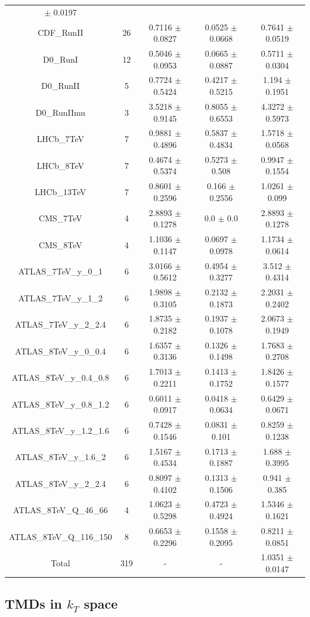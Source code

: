 \documentclass[
]{article}
\begin{document}
\begin{longtable}[]{@{}ccccc@{}}
\(\pm\) 0.0197\tabularnewline
CDF\_RunII & 26 & 0.7116 \(\pm\) 0.0827 & 0.0525 \(\pm\) 0.0668 & 0.7641
\(\pm\) 0.0519\tabularnewline
D0\_RunI & 12 & 0.5046 \(\pm\) 0.0953 & 0.0665 \(\pm\) 0.0887 & 0.5711
\(\pm\) 0.0304\tabularnewline
D0\_RunII & 5 & 0.7724 \(\pm\) 0.5424 & 0.4217 \(\pm\) 0.5215 & 1.194
\(\pm\) 0.1951\tabularnewline
D0\_RunIImu & 3 & 3.5218 \(\pm\) 0.9145 & 0.8055 \(\pm\) 0.6553 & 4.3272
\(\pm\) 0.5973\tabularnewline
LHCb\_7TeV & 7 & 0.9881 \(\pm\) 0.4896 & 0.5837 \(\pm\) 0.4834 & 1.5718
\(\pm\) 0.0568\tabularnewline
LHCb\_8TeV & 7 & 0.4674 \(\pm\) 0.5374 & 0.5273 \(\pm\) 0.508 & 0.9947
\(\pm\) 0.1554\tabularnewline
LHCb\_13TeV & 7 & 0.8601 \(\pm\) 0.2596 & 0.166 \(\pm\) 0.2556 & 1.0261
\(\pm\) 0.099\tabularnewline
CMS\_7TeV & 4 & 2.8893 \(\pm\) 0.1278 & 0.0 \(\pm\) 0.0 & 2.8893 \(\pm\)
0.1278\tabularnewline
CMS\_8TeV & 4 & 1.1036 \(\pm\) 0.1147 & 0.0697 \(\pm\) 0.0978 & 1.1734
\(\pm\) 0.0614\tabularnewline
ATLAS\_7TeV\_y\_0\_1 & 6 & 3.0166 \(\pm\) 0.5612 & 0.4954 \(\pm\) 0.3277
& 3.512 \(\pm\) 0.4314\tabularnewline
ATLAS\_7TeV\_y\_1\_2 & 6 & 1.9898 \(\pm\) 0.3105 & 0.2132 \(\pm\) 0.1873
& 2.2031 \(\pm\) 0.2402\tabularnewline
ATLAS\_7TeV\_y\_2\_2.4 & 6 & 1.8735 \(\pm\) 0.2182 & 0.1937 \(\pm\)
0.1078 & 2.0673 \(\pm\) 0.1949\tabularnewline
ATLAS\_8TeV\_y\_0\_0.4 & 6 & 1.6357 \(\pm\) 0.3136 & 0.1326 \(\pm\)
0.1498 & 1.7683 \(\pm\) 0.2708\tabularnewline
ATLAS\_8TeV\_y\_0.4\_0.8 & 6 & 1.7013 \(\pm\) 0.2211 & 0.1413 \(\pm\)
0.1752 & 1.8426 \(\pm\) 0.1577\tabularnewline
ATLAS\_8TeV\_y\_0.8\_1.2 & 6 & 0.6011 \(\pm\) 0.0917 & 0.0418 \(\pm\)
0.0634 & 0.6429 \(\pm\) 0.0671\tabularnewline
ATLAS\_8TeV\_y\_1.2\_1.6 & 6 & 0.7428 \(\pm\) 0.1546 & 0.0831 \(\pm\)
0.101 & 0.8259 \(\pm\) 0.1238\tabularnewline
ATLAS\_8TeV\_y\_1.6\_2 & 6 & 1.5167 \(\pm\) 0.4534 & 0.1713 \(\pm\)
0.1887 & 1.688 \(\pm\) 0.3995\tabularnewline
ATLAS\_8TeV\_y\_2\_2.4 & 6 & 0.8097 \(\pm\) 0.4102 & 0.1313 \(\pm\)
0.1506 & 0.941 \(\pm\) 0.385\tabularnewline
ATLAS\_8TeV\_Q\_46\_66 & 4 & 1.0623 \(\pm\) 0.5298 & 0.4723 \(\pm\)
0.4924 & 1.5346 \(\pm\) 0.1621\tabularnewline
ATLAS\_8TeV\_Q\_116\_150 & 8 & 0.6653 \(\pm\) 0.2296 & 0.1558 \(\pm\)
0.2095 & 0.8211 \(\pm\) 0.0851\tabularnewline
Total & 319 & - & - & 1.0351 \(\pm\) 0.0147\tabularnewline
\bottomrule
\end{longtable}

\hypertarget{tmds-in-k_t-space}{%
\subsection{\texorpdfstring{TMDs in \(k_T\)
space}{TMDs in k\_T space}}\label{tmds-in-k_t-space}}
\end{document}
